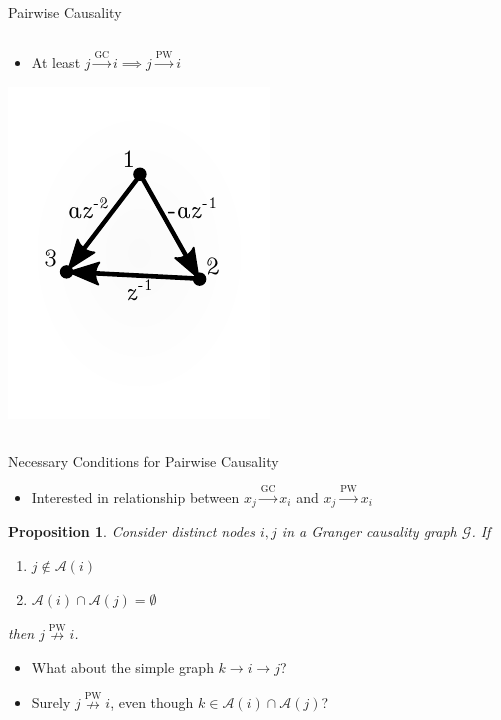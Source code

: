 \documentclass{beamer} %
\newtheorem*{proposition}{Proposition}
\def\gc{\overset{\text{GC}}{\rightarrow}}  %
\def\pwgc{\overset{\text{PW}}{\rightarrow}}  %
\def\npwgc{\overset{\text{PW}}{\nrightarrow}}  %
\def\gcg{\mathcal{G}}  %
\newcommand{\anc}[1]{\mathcal{A}(#1)}  %
\begin{document}
\begin{frame}{Pairwise Causality}
\begin{columns}
    \begin{column}{0.5\textwidth}
      \begin{itemize}
        \item{At least $j \gc i \implies j \pwgc i$}\pause
      \end{itemize}
      \includegraphics[width=0.75\linewidth]{../../figures/example2.pdf}
    \end{column}
  \end{columns}
\end{frame}

\begin{frame}{Necessary Conditions for Pairwise Causality}
  \begin{itemize}
    \item{Interested in relationship between $x_j \gc x_i$ and $x_j \pwgc x_i$}\pause
  \end{itemize}

  \begin{proposition}
    Consider distinct nodes $i, j$ in a Granger causality graph $\gcg$.
    If

    \begin{enumerate}
      \item{$j \not\in \anc{i}$}\pause
      \item{$\anc{i}\cap\anc{j} = \emptyset$}\pause
    \end{enumerate}

    then $j \npwgc i$.
  \end{proposition}\pause

  \begin{itemize}
    \item{What about the simple graph $k \rightarrow i \rightarrow j$?}\pause
    \item{Surely $j \npwgc i$, even though $k \in \anc{i} \cap \anc{j}$?}
  \end{itemize}
\end{frame}
\end{document}
